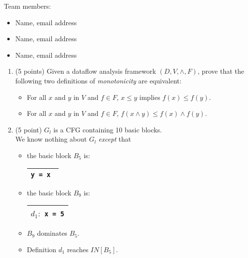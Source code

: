 \documentclass[12pt]{article}
\begin{document}
    \begin{mdframed}
      Team members:
      \begin{itemize}
        \item Name, email address %
        \item Name, email address %
        \item Name, email address %
      \end{itemize}
    \end{mdframed}

    \begin{enumerate}


            
        \item (5 points) Given a dataflow analysis framework $(D, V, \wedge, F)$,
        prove that the following two definitions of \emph{monotonicity} are equivalent:
        \begin{itemize}
          \item For all $x$ and $y$ in $V$ and $f \in F$, $x \leq y$ implies $f(x) \leq f(y)$.
          \item For all $x$ and $y$ in $V$ and $f \in F$, $f(x \wedge y) \leq f(x) \wedge f(y)$.
        \end{itemize}

        \begin{mdframed}
          \vspace{2em}
        \end{mdframed}

        \item  (5 point) $G_l$ is a CFG containing 10 basic blocks. \\We know nothing
        about $G_l$ \emph{except} that 
        
        \begin{itemize}
          \item the basic block $B_5$ is:
        \renewcommand{\arraystretch}{1}
        \begin{tabular}{|c|}
          \hline
          \lstinline$y = x $\\
          \hline
        \end{tabular}
        \item the basic block $B_9$ is:
        \renewcommand{\arraystretch}{1}
        \begin{tabular}{|c|}
          \hline
          $d_1: $ \lstinline$x = 5$\\
          \hline
        \end{tabular}
        \item $B_9$ dominates $B_5$.
        \item Definition $d_1$ reaches  $IN[B_5]$.
      \end{itemize}
    

\end{enumerate}
\end{document}
